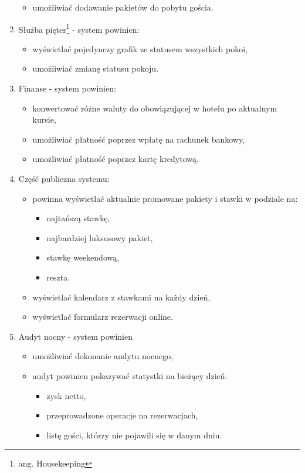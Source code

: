 \documentclass[a4paper,onecolumn,oneside,11pt,wide,floatssmall]{mwrep}
\theoremstyle{definition}
\theoremstyle{plain}%
\theoremstyle{remark}
\begin{document}
\begin{enumerate}
\begin{itemize}
      \item umożliwiać dodawanie pakietów do pobytu gościa.
    \end{itemize}
  \item Służba pięter\footnote{ang. Housekeeping} - system powinien:
    \begin{itemize}
      \item wyświetlać pojedynczy grafik ze statusem wszystkich pokoi,
      \item umożliwiać zmianę statusu pokoju.
    \end{itemize}
  \item Finanse - system powinien:
    \begin{itemize}
      \item konwertować różne waluty do obowiązującej w hotelu po aktualnym kursie,
      \item umożliwiać płatność poprzez wpłatę na rachunek bankowy,
      \item umożliwiać płatność poprzez kartę kredytową.
    \end{itemize}
  \item Część publiczna systemu:
    \begin{itemize}
      \item powinna wyświetlać aktualnie promowane pakiety i stawki w podziale na:
        \begin{itemize}
          \item najtańszą stawkę,
          \item najbardziej luksusowy pakiet,
          \item stawkę weekendową,
          \item reszta.
        \end{itemize}
      \item wyświetlać kalendarz z stawkami na każdy dzień,
      \item wyświetlać formularz rezerwacji online.
    \end{itemize}
  \item Audyt nocny - system powinien
    \begin{itemize}
      \item umożliwiać dokonanie audytu nocnego,
      \item audyt powinien pokazywać statystki na bieżący dzień:
        \begin{itemize}
          \item zysk netto,
          \item przeprowadzone operacje na rezerwacjach,
          \item listę gości, którzy nie pojawili się w danym dniu.
        \end{itemize}
    \end{itemize}
\end{enumerate}
\end{document}
